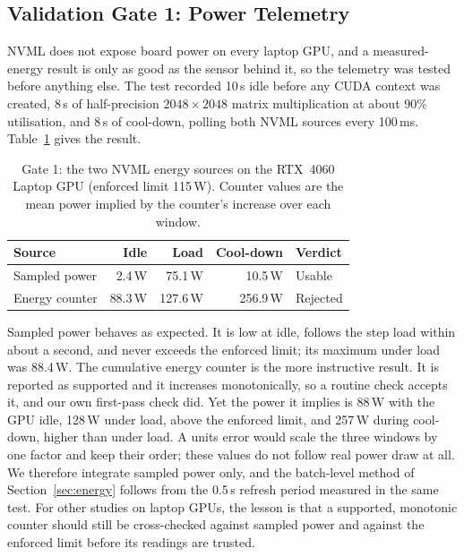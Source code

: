 \subsection{Validation Gate 1: Power Telemetry}
\label{sec:gate-telemetry}

NVML does not expose board power on every laptop GPU, and a measured-energy
result is only as good as the sensor behind it, so the telemetry was tested
before anything else. The test recorded 10\,s idle before any CUDA context
was created, 8\,s of half-precision $2048 \times 2048$ matrix multiplication
at about 90\% utilisation, and 8\,s of cool-down, polling both NVML sources
every 100\,ms. Table~\ref{tab:gate1} gives the result.

\begin{table}[!t]
\centering
\caption{Gate 1: the two NVML energy sources on the RTX~4060 Laptop GPU
(enforced limit 115\,W). Counter values are the mean power implied by the
counter's increase over each window.}
\label{tab:gate1}
\renewcommand{\arraystretch}{1.1}
\begin{tabular}{@{}l r r r l@{}}
\toprule
Source & Idle & Load & Cool-down & Verdict \\
\midrule
Sampled power & 2.4\,W & 75.1\,W & 10.5\,W & Usable \\
Energy counter & 88.3\,W & 127.6\,W & 256.9\,W & Rejected \\
\bottomrule
\end{tabular}
\end{table}

Sampled power behaves as expected. It is low at idle, follows the step load
within about a second, and never exceeds the enforced limit; its maximum
under load was 88.4\,W. The cumulative energy counter is the more
instructive result. It is reported as supported and it increases
monotonically, so a routine check accepts it, and our own first-pass check
did. Yet the power it implies is 88\,W with the GPU idle, 128\,W under load,
above the enforced limit, and 257\,W during cool-down, higher than under
load. A units error would scale the three windows by one factor and keep
their order; these values do not follow real power draw at all. We therefore
integrate sampled power only, and the batch-level method of
Section~\ref{sec:energy} follows from the 0.5\,s refresh period measured in
the same test. For other studies on laptop GPUs, the lesson is that a
supported, monotonic counter should still be cross-checked against sampled
power and against the enforced limit before its readings are trusted.

